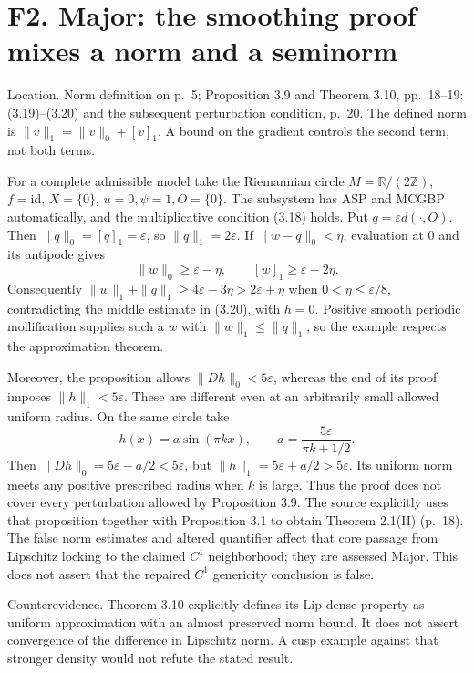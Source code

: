 \documentclass[10pt]{article}
\begin{document}
\section*{F2. Major: the smoothing proof mixes a norm and a seminorm}
Location. Norm definition on p. 5; Proposition 3.9 and Theorem 3.10, pp. 18–19; (3.19)–(3.20) and the subsequent perturbation condition, p. 20. The defined norm is \(\|v\|_1=\|v\|_0+[v]_1\). A bound on the gradient controls the second term, not both terms.\par
For a complete admissible model take the Riemannian circle \(M=\mathbb R/(2\mathbb Z)\), \(f=\mathrm{id}\), \(X=\{0\}\), \(u=0,\psi=1,O=\{0\}\). The subsystem has ASP and MCGBP automatically, and the multiplicative condition (3.18) holds. Put \(q=\varepsilon d(\cdot,O)\). Then \(\|q\|_0=[q]_1=\varepsilon\), so \(\|q\|_1=2\varepsilon\). If \(\|w-q\|_0<\eta\), evaluation at \(0\) and its antipode gives \[\|w\|_0\ge\varepsilon-\eta,\qquad [w]_1\ge\varepsilon-2\eta.\] Consequently \(\|w\|_1+\|q\|_1\ge4\varepsilon-3\eta>2\varepsilon+\eta\) when \(0<\eta\le\varepsilon/8\), contradicting the middle estimate in (3.20), with \(h=0\). Positive smooth periodic mollification supplies such a \(w\) with \(\|w\|_1\le\|q\|_1\), so the example respects the approximation theorem.\par
Moreover, the proposition allows \(\|Dh\|_0<5\varepsilon\), whereas the end of its proof imposes \(\|h\|_1<5\varepsilon\). These are different even at an arbitrarily small allowed uniform radius. On the same circle take \[h(x)=a\sin(\pi kx),\qquad
 a=\frac{5\varepsilon}{\pi k+1/2}.\] Then \(\|Dh\|_0=5\varepsilon-a/2<5\varepsilon\), but \(\|h\|_1=5\varepsilon+a/2>5\varepsilon\). Its uniform norm meets any positive prescribed radius when \(k\) is large. Thus the proof does not cover every perturbation allowed by Proposition 3.9. The source explicitly uses that proposition together with Proposition 3.1 to obtain Theorem 2.1(II) (p. 18). The false norm estimates and altered quantifier affect that core passage from Lipschitz locking to the claimed \(C^1\) neighborhood; they are assessed Major. This does not assert that the repaired \(C^1\) genericity conclusion is false.\par
Counterevidence. Theorem 3.10 explicitly defines its Lip-dense property as uniform approximation with an almost preserved norm bound. It does not assert convergence of the difference in Lipschitz norm. A cusp example against that stronger density would not refute the stated result.\par
\end{document}
